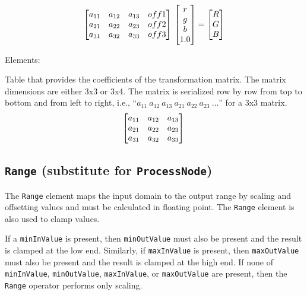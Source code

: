 \begin{equation}
    \begin{bmatrix*}
        a_{11} & a_{12} & a_{13} & off1\\
        a_{21} & a_{22} & a_{23} & off2\\
        a_{31} & a_{32} & a_{33} & off3\\
    \end{bmatrix*} \\
    \begin{bmatrix}
        r\\
        g\\
        b\\
        1.0
    \end{bmatrix}
    =
    \begin{bmatrix}
        R\\
        G\\
        B
    \end{bmatrix}
\end{equation}
 
Elements:
\begin{xmlfields}
	\xmlitem[Array][required] Table that provides the coefficients of the transformation matrix. The matrix dimensions are either 3x3 or 3x4. The matrix is serialized row by row from top to bottom and from left to right, i.e., ``$a_{11}\ a_{12}\ a_{13}\ a_{21}\ a_{22}\ a_{23}\ \ldots$'' for a 3x3 matrix.
		\begin{equation}
		    \begin{bmatrix*}
		        a_{11} & a_{12} & a_{13} \\
		        a_{21} & a_{22} & a_{23} \\
		        a_{31} & a_{32} & a_{33} \\
		    \end{bmatrix*} \\
		\end{equation}
	
\end{xmlfields}

\subsection{\texttt{Range} (substitute for \texttt{ProcessNode})}
The \texttt{Range} element maps the input domain to the output range by scaling and offsetting values and must be calculated in floating point. The \texttt{Range} element is also used to clamp values.

If a \texttt{minInValue} is present, then \texttt{minOutValue} must also be present and the result is clamped at the low end. Similarly, if \texttt{maxInValue} is present, then \texttt{maxOutValue} must also be present and the result is clamped at the high end. If none of \texttt{minInValue}, \texttt{minOutValue}, \texttt{maxInValue}, or \texttt{maxOutValue} are present, then the \texttt{Range} operator performs only scaling.

